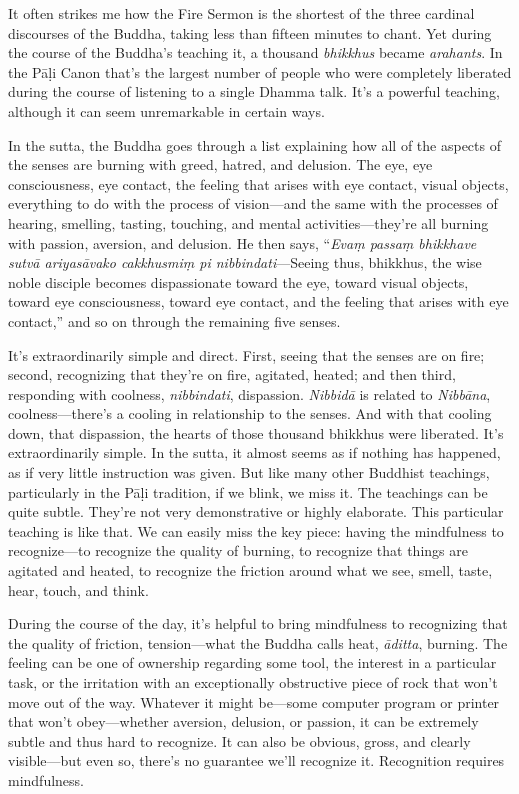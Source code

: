 
It often strikes me how the Fire Sermon is the shortest of the three 
cardinal discourses of the Buddha, taking less than fifteen minutes to 
chant. Yet during the course of the Buddha's teaching it, a thousand 
\emph{bhikkhus} became \emph{arahants}. In the Pāḷi Canon that's the 
largest number of people who were completely liberated during the 
course of listening to a single Dhamma talk. It's a powerful teaching, 
although it can seem unremarkable in certain ways.

In the sutta, the Buddha goes through a list explaining how all of the 
aspects of the senses are burning with greed, hatred, and delusion. The 
eye, eye consciousness, eye contact, the feeling that arises with eye 
contact, visual objects, everything to do with the process of 
vision---and the same with the processes of hearing, smelling, tasting, 
touching, and mental activities---they're all burning with passion, 
aversion, and delusion. He then says, ``\emph{Evaṃ passaṃ bhikkhave 
sutvā ariyasāvako cakkhusmiṃ pi nibbindati}---Seeing thus, 
bhikkhus, the wise noble disciple becomes dispassionate toward the eye, 
toward visual objects, toward eye consciousness, toward eye contact, 
and the feeling that arises with eye contact,'' and so on through the 
remaining five senses.

It's extraordinarily simple and direct. First, seeing that the senses 
are on fire; second, recognizing that they're on fire, agitated, 
heated; and then third, responding with coolness, \emph{nibbindati}, 
dispassion. \emph{Nibbidā} is related to \emph{Nibbāna}, 
coolness---there's a cooling in relationship to the senses. And with 
that cooling down, that dispassion, the hearts of those thousand 
bhikkhus were liberated. It's extraordinarily simple. In the sutta, it 
almost seems as if nothing has happened, as if very little instruction 
was given. But like many other Buddhist teachings, particularly in the 
Pāḷi tradition, if we blink, we miss it. The teachings can be quite 
subtle. They're not very demonstrative or highly elaborate. This 
particular teaching is like that. We can easily miss the key piece: 
having the mindfulness to recognize---to recognize the quality of 
burning, to recognize that things are agitated and heated, to recognize 
the friction around what we see, smell, taste, hear, touch, and think.

During the course of the day, it's helpful to bring mindfulness to 
recognizing that the quality of friction, tension---what the Buddha 
calls heat, \emph{āditta}, burning. The feeling can be one of 
ownership regarding some tool, the interest in a particular task, or 
the irritation with an exceptionally obstructive piece of rock that 
won't move out of the way. Whatever it might be---some computer program 
or printer that won't obey---whether aversion, delusion, or passion, it 
can be extremely subtle and thus hard to recognize. It can also be 
obvious, gross, and clearly visible---but even so, there's no guarantee 
we'll recognize it. Recognition requires mindfulness.

